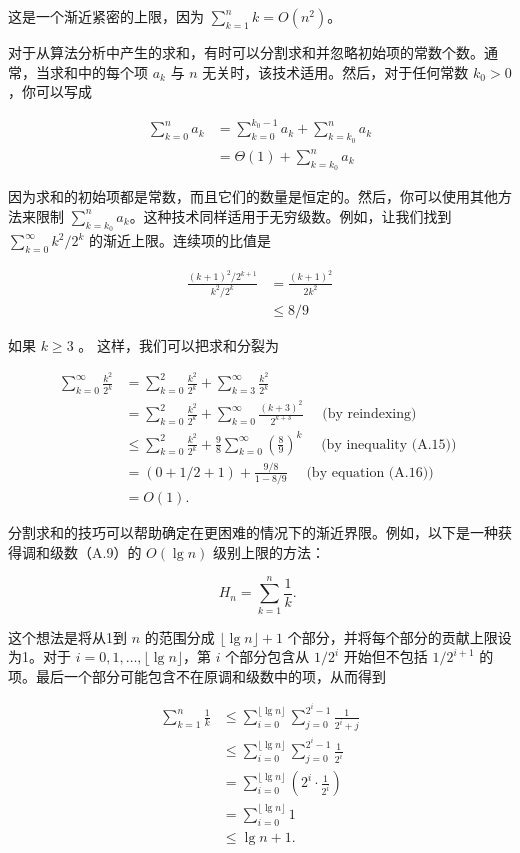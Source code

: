 \documentclass[lang=cn,newtx,10pt,scheme=chinese]{elegantbook}
\begin{document}
这是一个渐近紧密的上限，因为 $\sum_{k=1}^n k=O\left(n^2\right)$。

对于从算法分析中产生的求和，有时可以分割求和并忽略初始项的常数个数。通常，当求和中的每个项 $a_k$ 与 $n$ 无关时，该技术适用。然后，对于任何常数 $k_0>0$，你可以写成

$$
\begin{aligned}
\sum_{k=0}^n a_k & =\sum_{k=0}^{k_0-1} a_k+\sum_{k=k_0}^n a_k \\
& =\Theta(1)+\sum_{k=k_0}^n a_k
\end{aligned}
$$

因为求和的初始项都是常数，而且它们的数量是恒定的。然后，你可以使用其他方法来限制 $\sum_{k=k_0}^n a_k$。这种技术同样适用于无穷级数。例如，让我们找到 $\sum_{k=0}^{\infty} k^2 / 2^k$ 的渐近上限。连续项的比值是

$$
\begin{aligned}
\frac{(k+1)^2 / 2^{k+1}}{k^2 / 2^k} & =\frac{(k+1)^2}{2 k^2} \\
& \leq 8 / 9
\end{aligned}
$$

如果 $k \geq 3$ 。 这样，我们可以把求和分裂为

$$
\begin{aligned}
\sum_{k=0}^{\infty} \frac{k^2}{2^k} & =\sum_{k=0}^2 \frac{k^2}{2^k}+\sum_{k=3}^{\infty} \frac{k^2}{2^k} \\
& =\sum_{k=0}^2 \frac{k^2}{2^k}+\sum_{k=0}^{\infty} \frac{(k+3)^2}{2^{k+3}} \quad \text { (by reindexing) } \\
& \leq \sum_{k=0}^2 \frac{k^2}{2^k}+\frac{9}{8} \sum_{k=0}^{\infty}\left(\frac{8}{9}\right)^k \quad \text { (by inequality (A.15)) } \\
& =(0+1 / 2+1)+\frac{9 / 8}{1-8 / 9} \quad \text { (by equation (A.16)) } \\
& =O(1) .
\end{aligned}
$$

分割求和的技巧可以帮助确定在更困难的情况下的渐近界限。例如，以下是一种获得调和级数（A.9）的 $O(\lg n)$ 级别上限的方法：

$$
H_n=\sum_{k=1}^n \frac{1}{k} \text {. }
$$

这个想法是将从1到 $n$ 的范围分成 $\lfloor\lg n\rfloor+1$ 个部分，并将每个部分的贡献上限设为1。对于 $i=0,1, \ldots,\lfloor\lg n\rfloor$，第 $i$ 个部分包含从 $1 / 2^i$ 开始但不包括 $1 / 2^{i+1}$ 的项。最后一个部分可能包含不在原调和级数中的项，从而得到

$$
\begin{aligned}
\sum_{k=1}^n \frac{1}{k} & \leq \sum_{i=0}^{\lfloor\lg n\rfloor} \sum_{j=0}^{2^i-1} \frac{1}{2^i+j} \\
& \leq \sum_{i=0}^{\lfloor\lg n\rfloor} \sum_{j=0}^{2^i-1} \frac{1}{2^i} \\
& =\sum_{i=0}^{\lfloor\lg n\rfloor}\left(2^i \cdot \frac{1}{2^i}\right) \\
& =\sum_{i=0}^{\lfloor\lg n\rfloor} 1 \\
& \leq \lg n+1 .
\end{aligned}
$$
\end{document}
